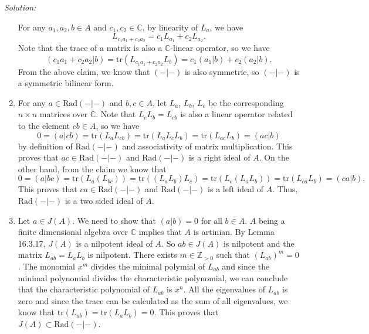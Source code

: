 \documentclass[a4paper, 12pt]{article}
\newenvironment{solution}
    {\textit{Solution:}}
    {}
\newcommand{\tr}{\text{tr}}
\newcommand{\Rad}{\text{Rad}}
\begin{document}
\begin{solution}
\begin{enumerate}[(1)]
For any \(a_1,a_2,b\in A\) and \(c_1,c_2\in \mathbb{C}\), by linearity of \(L_a\), we have 
\[L_{c_1a_1+c_2a_2}=c_1L_{a_1}+c_2L_{a_2}.\]
Note that the trace of a matrix is also a \(\mathbb{C}\)-linear operator, so we have 
\[(c_1a_1+c_2a_2|b)=\tr(L_{c_1a_1+c_2a_2}L_b)=c_1(a_1|b)+c_2(a_2|b).\]
From the above claim, we know that \((-|-)\) is also symmetric, so \((-|-)\) is a symmetric bilinear form.
\item For any \(a\in \Rad(-|-)\) and \(b,c\in A\), let \(L_a\), \(L_b\), \(L_c\) be the corresponding \(n\times n\) matrices over \(\mathbb{C}\). Note that \(L_cL_b=L_{cb}\) is also a linear operator related to the element \(cb\in A\), so we have 
\[0=(a|cb)=\tr(L_aL_{cb})=\tr(L_aL_cL_b)=\tr(L_{ac}L_b)=(ac|b)\] 
by definition of \(\Rad(-|-)\) and associativity of matrix multiplication. This proves that \(ac\in \Rad(-|-)\) and \(\Rad(-|-)\) is a right ideal of \(A\). On the other hand, from the claim we know that 
\[0=(a|bc)=\tr(L_a(L_{bc}))=\tr((L_aL_b)L_c)=\tr(L_c(L_aL_b))=\tr(L_{ca}L_b)=(ca|b).\]
This proves that \(ca\in \Rad(-|-)\) and \(\Rad(-|-)\) is a left ideal of \(A\). Thus, \(\Rad(-|-)\) is a two sided ideal of \(A\). 
\item Let \(a\in J(A)\). We need to show that \((a|b)=0\) for all \(b\in A\). \(A\) being a finite dimensional algebra over \(\mathbb{C}\) implies that \(A\) is artinian. By Lemma 16.3.17, \(J(A)\) is a nilpotent ideal of \(A\). So \(ab\in J(A)\) is nilpotent and the matrix 
\(L_{ab}=L_aL_b\) is nilpotent. There exists \(m\in \mathbb{Z}_{>0}\) such that \((L_{ab})^m=0\). The monomial \(x^m\) divides the minimal polymial of \(L_{ab}\) and since the minimal polynomial divides the characteristic polynomial, we can conclude that the characteristic polynomial of 
\(L_{ab}\) is \(x^n\). All the eigenvalues of \(L_{ab}\) is zero and since the trace can be calculated as the sum of all eigenvalues, we know that \(\tr(L_{ab})=\tr(L_aL_b)=0\). This proves that \(J(A)\subset \Rad(-|-)\). 


\end{enumerate}
\end{solution}
\end{document}
